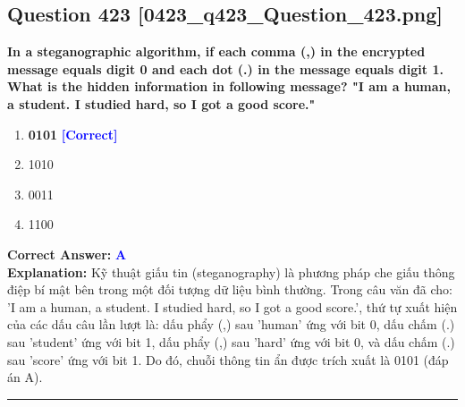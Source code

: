\documentclass[11pt,a4paper]{article}
\begin{document}
\begin{minipage}{\textwidth}
\subsection*{Question 423 \quad \footnotesize{[0423\_q423\_Question\_423.png]}}
\noindent \textbf{In a steganographic algorithm, if each comma (,) in the encrypted message equals digit 0 and each dot (.) in the message equals digit 1. What is the hidden information in following message? "I am a human, a student. I studied hard, so I got a good score."}

\begin{enumerate}[label=\Alph*.]
    \item \textbf{0101} \hfill \textcolor{blue}{\textbf{[Correct]}}
    \item 1010
    \item 0011
    \item 1100
\end{enumerate}

\noindent \textbf{Correct Answer:} \textcolor{blue}{\textbf{A}} \\[2pt]
\noindent \textbf{Explanation:} Kỹ thuật giấu tin (steganography) là phương pháp che giấu thông điệp bí mật bên trong một đối tượng dữ liệu bình thường. Trong câu văn đã cho: 'I am a human, a student. I studied hard, so I got a good score.', thứ tự xuất hiện của các dấu câu lần lượt là: dấu phẩy (,) sau 'human' ứng với bit 0, dấu chấm (.) sau 'student' ứng với bit 1, dấu phẩy (,) sau 'hard' ứng với bit 0, và dấu chấm (.) sau 'score' ứng với bit 1. Do đó, chuỗi thông tin ẩn được trích xuất là 0101 (đáp án A).

\par\vspace{0.3cm}
\hrule
\vspace{0.3cm}
\end{minipage}
\end{document}
